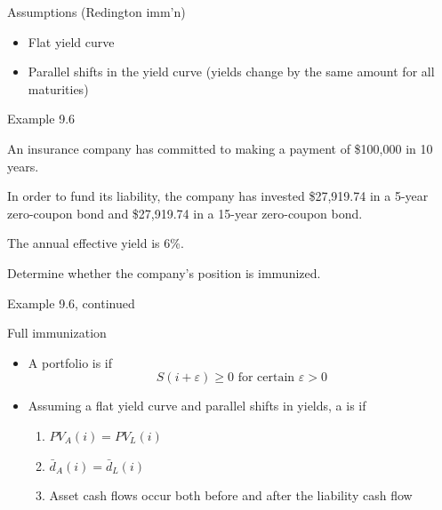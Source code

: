 \documentclass{beamer}
\begin{document}
\begin{frame}{Assumptions (Redington imm'n)}

\begin{itemize}
\item Flat yield curve
\medskip
\item Parallel shifts in the yield curve (yields change by the same amount for all maturities)
\end{itemize}

\end{frame}

\begin{frame}{Example 9.6}

An insurance company has committed to making a payment of \$100,000 in 10 years.

\medskip
In order to fund its liability, the company has invested \$27,919.74 in a 5-year zero-coupon bond and \$27,919.74 in a 15-year zero-coupon bond.

\medskip
The annual effective yield is 6\%.

\medskip
Determine whether the company's position is immunized.

\end{frame}

\begin{frame}{Example 9.6, continued}

\begin{center}
\end{center}

\vfill
\end{frame}

\begin{frame}{Full immunization}

\begin{itemize}
\item A portfolio is  if
\[
S(i + \varepsilon) \ge 0 \text{ for certain } \varepsilon > 0
\]
\item Assuming a flat yield curve and parallel shifts in yields, a  is  if
\begin{enumerate}
\item $PV_A(i) = PV_L(i)$
\item $\bar{d}_A(i) = \bar{d}_L(i)$
\item Asset cash flows occur both before and after the liability cash flow
\end{enumerate}
\end{itemize}

\end{frame}
\end{document}
